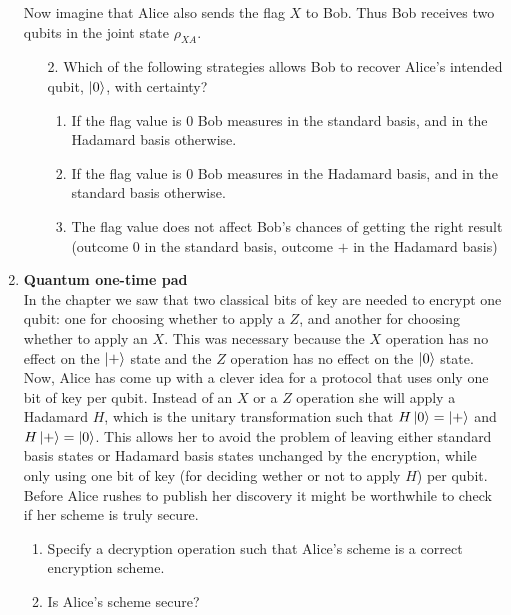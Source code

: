 \documentclass[12pt]{article}
\begin{document}
\begin{enumerate}
Now imagine that Alice also sends the flag $X$ to Bob. Thus Bob receives two qubits in the joint state $\rho_{XA}$.
\begin{enumerate}
\item[2.] Which of the following strategies allows Bob to recover Alice's intended qubit, $\ket{0}$, with certainty? 
\begin{enumerate}
\item If the flag value is $0$ Bob measures in the standard basis, and in the Hadamard basis otherwise.
\item If the flag value is $0$ Bob measures in the Hadamard basis, and in the standard basis otherwise.
\item The flag value does not affect Bob's chances of getting the right result (outcome $0$ in the standard basis, outcome $+$ in the Hadamard basis)
\end{enumerate}
\end{enumerate}

\item {\bf Quantum one-time pad}\\
In the chapter we saw that two classical bits of key are needed to encrypt one qubit: one for choosing whether to apply a $Z$, and another for choosing whether to apply an $X$. This was necessary because the $X$ operation has no effect on the $\ket{+}$ state and the $Z$ operation has no effect on the $\ket{0}$ state. Now, Alice has come up with a clever idea for a protocol that uses only one bit of key per qubit. Instead of an $X$ or a $Z$ operation she will apply a Hadamard $H$, which is the unitary transformation such that $H\ket{0} = \ket{+}$ and $H\ket{+} = \ket{0}$. This allows her to avoid the problem of leaving either standard basis states or Hadamard basis states unchanged by the encryption, while only using one bit of key (for deciding wether or not to apply $H$) per qubit. Before Alice rushes to publish her discovery it might be worthwhile to check if her scheme is truly secure.
\begin{enumerate}
\item Specify a decryption operation such that Alice's scheme is a correct encryption scheme. 
\item Is Alice's scheme secure? 
\end{enumerate}




\end{enumerate}
\end{document}
